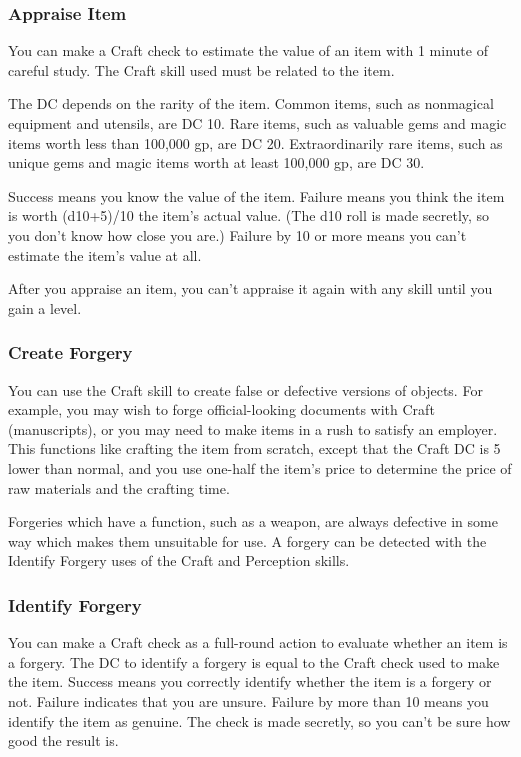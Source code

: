 \subsubsection{Appraise Item}
You can make a Craft check to estimate the value of an item with 1 minute of careful study. The Craft skill used must be related to the item.

The DC depends on the rarity of the item. Common items, such as nonmagical equipment and utensils, are DC 10. Rare items, such as valuable gems and magic items worth less than 100,000 gp, are DC 20. Extraordinarily rare items, such as unique gems and magic items worth at least 100,000 gp, are DC 30.

Success means you know the value of the item. Failure means you think the item is worth (d10+5)/10 \mtimes the item's actual value. (The d10 roll is made secretly, so you don't know how close you are.) Failure by 10 or more means you can't estimate the item's value at all.

After you appraise an item, you can't appraise it again with any skill until you gain a level.

\subsubsection{Create Forgery}
You can use the Craft skill to create false or defective versions of objects. For example, you may wish to forge official-looking documents with Craft (manuscripts), or you may need to make items in a rush to satisfy an employer. This functions like crafting the item from scratch, except that the Craft DC is 5 lower than normal, and you use one-half the item's price to determine the price of raw materials and the crafting time.

Forgeries which have a function, such as a weapon, are always defective in some way which makes them unsuitable for use. A forgery can be detected with the Identify Forgery uses of the Craft and Perception skills.

\subsubsection{Identify Forgery}
You can make a Craft check as a full-round action to evaluate whether an item is a forgery. The DC to identify a forgery is equal to the Craft check used to make the item. Success means you correctly identify whether the item is a forgery or not. Failure indicates that you are unsure. Failure by more than 10 means you identify the item as genuine. The check is made secretly, so you can't be sure how good the result is.

